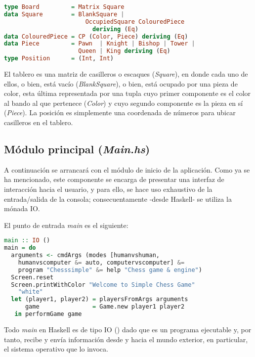 \documentclass{llncs}
\begin{document}
\begin{lstlisting}[frame=single, language=haskell, captionpos=b, caption=Tipo de Board y derivados, label={lst:tipo_board}]
type Board         = Matrix Square
data Square        = BlankSquare |
                       OccupiedSquare ColouredPiece
                         deriving (Eq)
data ColouredPiece = CP (Color, Piece) deriving (Eq)
data Piece         = Pawn  | Knight | Bishop | Tower |
                     Queen | King deriving (Eq)
type Position      = (Int, Int)
\end{lstlisting}

El tablero es una matriz de casilleros o escaques (\textit{Square}), en donde cada uno de ellos, o bien, está vacío (\textit{BlankSquare}), o bien, está ocupado por una pieza de color, esta última representada por una tupla cuyo primer componente es el color al bando al que pertenece (\textit{Color}) y cuyo segundo componente es la pieza en sí (\textit{Piece}). La posición es simplemente una coordenada de números para ubicar casilleros en el tablero.

\subsection{Módulo principal (\textit{Main.hs})}

A continuación se arrancará con el módulo de inicio de la aplicación. Como ya se ha mencionado, este componente se encarga de presentar una interfaz de interacción hacia el usuario, y para ello, se hace uso exhaustivo de la entrada/salida de la consola; consecuentamente -desde Haskell- se utiliza la mónada IO.

El punto de entrada \textit{main} es el siguiente:

\begin{lstlisting}[frame=single, language=haskell, captionpos=b, caption=Punto de entrada de la aplicación, label={lst:punto_entrada}]
main :: IO ()
main = do
  arguments <- cmdArgs (modes [humanvshuman,
    humanvscomputer &= auto, computervscomputer] &=
    program "Chesssimple" &= help "Chess game & engine")
  Screen.reset
  Screen.printWithColor "Welcome to Simple Chess Game"
    "white"
  let (player1, player2) = playersFromArgs arguments
      game               = Game.new player1 player2
   in performGame game
\end{lstlisting}

Todo \textit{main} en Haskell es de tipo IO () dado que es un programa ejecutable y, por tanto, recibe y envía información desde y hacia el mundo exterior, en particular, el sistema operativo que lo invoca.
\end{document}
